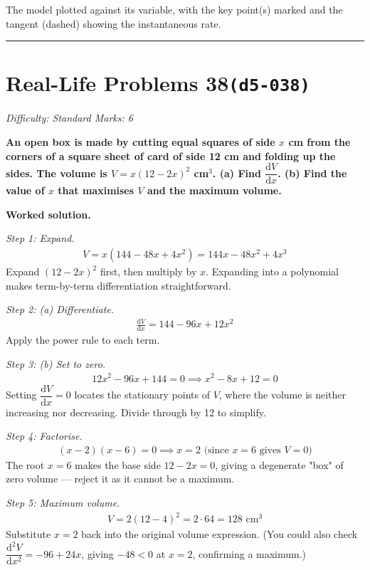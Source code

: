 \documentclass[11pt]{article}
\newcommand{\question}[1]{\par\medskip\noindent\textbf{#1}\par}
\begin{document}
\small The model plotted against its variable, with the key point(s) marked and the tangent (dashed) showing the instantaneous rate.\normalsize

\medskip\hrule

\section*{Real-Life Problems 38\quad\small\texttt{(d5-038)}}
\textit{Difficulty: Standard \quad\textbar\quad Marks: 6}

\question{An open box is made by cutting equal squares of side \( x \) cm from the corners of a square sheet of card of side 12 cm and folding up the sides. The volume is \( V = x(12 - 2x)^2 \) cm\(^3\). (a) Find \( \dfrac{\mathrm{d}V}{\mathrm{d}x} \). (b) Find the value of \( x \) that maximises \( V \) and the maximum volume.}

\textbf{Worked solution.}

\textit{Step 1: Expand.}
\[\begin{gathered}
V = x(144 - 48x + 4x^2) = 144x - 48x^2 + 4x^3
\end{gathered}\]
Expand \( (12 - 2x)^2 \) first, then multiply by \( x \). Expanding into a polynomial makes term-by-term differentiation straightforward.

\textit{Step 2: (a) Differentiate.}
\[\begin{gathered}
\frac{\mathrm{d}V}{\mathrm{d}x} = 144 - 96x + 12x^2
\end{gathered}\]
Apply the power rule to each term.

\textit{Step 3: (b) Set to zero.}
\[\begin{gathered}
12x^2 - 96x + 144 = 0 \implies x^2 - 8x + 12 = 0
\end{gathered}\]
Setting \( \dfrac{\mathrm{d}V}{\mathrm{d}x} = 0 \) locates the stationary points of \( V \), where the volume is neither increasing nor decreasing. Divide through by 12 to simplify.

\textit{Step 4: Factorise.}
\[\begin{gathered}
(x-2)(x-6) = 0 \implies x = 2 \text{ (since } x = 6 \text{ gives } V = 0)
\end{gathered}\]
The root \( x = 6 \) makes the base side \( 12 - 2x = 0 \), giving a degenerate "box" of zero volume --- reject it as it cannot be a maximum.

\textit{Step 5: Maximum volume.}
\[\begin{gathered}
V = 2(12 - 4)^2 = 2 \cdot 64 = 128 \text{ cm}^3
\end{gathered}\]
Substitute \( x = 2 \) back into the original volume expression. (You could also check \( \dfrac{\mathrm{d}^2V}{\mathrm{d}x^2} = -96 + 24x \), giving \( -48 < 0 \) at \( x = 2 \), confirming a maximum.)
\end{document}
